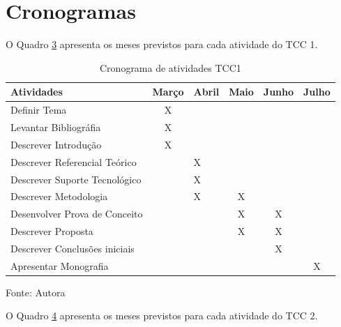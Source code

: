 \section{Cronogramas}\label{sec:cronog}

O Quadro \hyperref[tab:3]{3} apresenta os meses previstos para cada atividade do TCC 1.

\begin{table}[htbp]
    \centering
    \begin{threeparttable}
        \caption{Cronograma de atividades TCC1}
        \label{tab:3}
        \begin{tabular}{>{\raggedright\arraybackslash}m{6cm} c m{1cm} c c c}
        \toprule 
        Atividades & Março & Abril & Maio & Junho & Julho \\
        \midrule
        Definir Tema & X &  &  &  & \\
        \hline 
        Levantar Bibliográfia & X &  &  &  & \\
        \hline 
        Descrever Introdução & X &  &  &  & \\
        \hline 
        Descrever Referencial Teórico &  & X & &  & \\
        \hline 
        Descrever Suporte Tecnológico & & X & &  & \\
        \hline 
        Descrever Metodologia &  & X &  X &  & \\
        \hline 
        Desenvolver Prova de Conceito &  &  & X & X & \\
        \hline 
        Descrever Proposta &  &  & X & X & \\
        \hline 
        Descrever Conclusões iniciais &  &  &  & X & \\
        \hline
        Apresentar Monografia &  &  &  & & X \\
        \bottomrule 
        \end{tabular}
        \begin{tablenotes}
            \small
            \centering
            \item Fonte: Autora
        \end{tablenotes}
    \end{threeparttable}
\end{table}

O Quadro \hyperref[tab:4]{4} apresenta os meses previstos para cada atividade do TCC 2.

